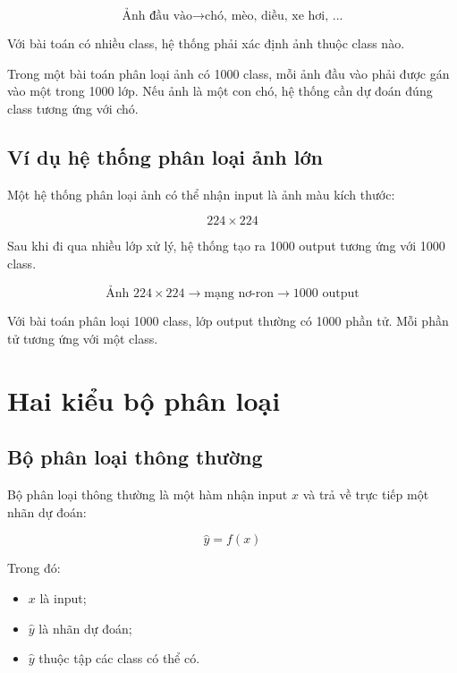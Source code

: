 \documentclass[12pt,a4paper]{report}
\begin{document}
\[
    \text{Ảnh đầu vào}
    \longrightarrow
    \text{chó, mèo, diều, xe hơi, ...}
\]

Với bài toán có nhiều class, hệ thống phải xác định ảnh thuộc class nào.

\begin{vidu}
Trong một bài toán phân loại ảnh có 1000 class, mỗi ảnh đầu vào phải được gán vào một trong 1000 lớp. Nếu ảnh là một con chó, hệ thống cần dự đoán đúng class tương ứng với chó.
\end{vidu}

\section{Ví dụ hệ thống phân loại ảnh lớn}

Một hệ thống phân loại ảnh có thể nhận input là ảnh màu kích thước:

\[
    224 \times 224
\]

Sau khi đi qua nhiều lớp xử lý, hệ thống tạo ra 1000 output tương ứng với 1000 class.

\[
    \text{Ảnh } 224 \times 224
    \longrightarrow
    \text{mạng nơ-ron}
    \longrightarrow
    1000 \text{ output}
\]

\begin{ghinho}
Với bài toán phân loại 1000 class, lớp output thường có 1000 phần tử. Mỗi phần tử tương ứng với một class.
\end{ghinho}

\chapter{Hai kiểu bộ phân loại}

\section{Bộ phân loại thông thường}

Bộ phân loại thông thường là một hàm nhận input $x$ và trả về trực tiếp một nhãn dự đoán:

\[
    \hat{y}=f(x)
\]

Trong đó:

\begin{itemize}
    \item $x$ là input;
    \item $\hat{y}$ là nhãn dự đoán;
    \item $\hat{y}$ thuộc tập các class có thể có.
\end{itemize}
\end{document}
